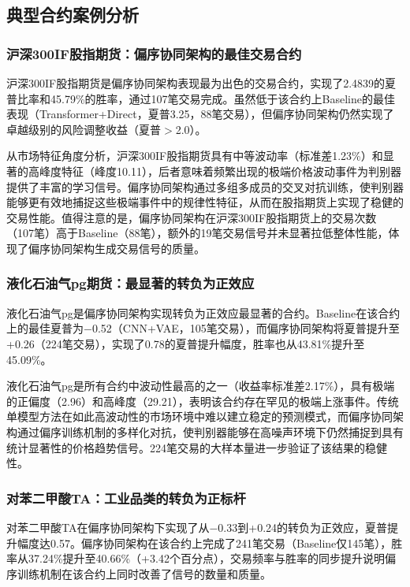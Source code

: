 \subsection{典型合约案例分析}

\subsubsection{沪深300IF股指期货：偏序协同架构的最佳交易合约}

沪深300IF股指期货是偏序协同架构表现最为出色的交易合约，实现了2.4839的夏普比率和45.79\%的胜率，通过107笔交易完成。虽然低于该合约上Baseline的最佳表现（Transformer+Direct，夏普3.25，88笔交易），但偏序协同架构仍然实现了卓越级别的风险调整收益（夏普$>$2.0）。

从市场特征角度分析，沪深300IF股指期货具有中等波动率（标准差1.23\%）和显著的高峰度特征（峰度10.11），后者意味着频繁出现的极端价格波动事件为判别器提供了丰富的学习信号。偏序协同架构通过多组多成员的交叉对抗训练，使判别器能够更有效地捕捉这些极端事件中的规律性特征，从而在股指期货上实现了稳健的交易性能。值得注意的是，偏序协同架构在沪深300IF股指期货上的交易次数（107笔）高于Baseline（88笔），额外的19笔交易信号并未显著拉低整体性能，体现了偏序协同架构生成交易信号的质量。

\subsubsection{液化石油气pg期货：最显著的转负为正效应}

液化石油气pg是偏序协同架构实现转负为正效应最显著的合约。Baseline在该合约上的最佳夏普为$-$0.52（CNN+VAE，105笔交易），而偏序协同架构将夏普提升至+0.26（224笔交易），实现了0.78的夏普提升幅度，胜率也从43.81\%提升至45.09\%。

液化石油气pg是所有合约中波动性最高的之一（收益率标准差2.17\%），具有极端的正偏度（2.96）和高峰度（29.21），表明该合约存在罕见的极端上涨事件。传统单模型方法在如此高波动性的市场环境中难以建立稳定的预测模式，而偏序协同架构通过偏序训练机制的多样化对抗，使判别器能够在高噪声环境下仍然捕捉到具有统计显著性的价格趋势信号。224笔交易的大样本量进一步验证了该结果的稳健性。

\subsubsection{对苯二甲酸TA：工业品类的转负为正标杆}

对苯二甲酸TA在偏序协同架构下实现了从$-$0.33到+0.24的转负为正效应，夏普提升幅度达0.57。偏序协同架构在该合约上完成了241笔交易（Baseline仅145笔），胜率从37.24\%提升至40.66\%（+3.42个百分点），交易频率与胜率的同步提升说明偏序训练机制在该合约上同时改善了信号的数量和质量。

